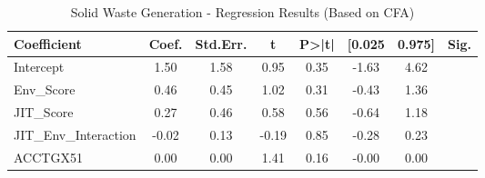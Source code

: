 \begin{table}[htbp]
    \centering
    \caption{Solid Waste Generation - Regression Results (Based on CFA)}
    \label{tab:regression}
    \begin{tabular}{lccccccc}
\toprule
Coefficient & Coef. & Std.Err. & t & P>|t| & [0.025 & 0.975] & Sig. \\
\midrule
Intercept & 1.50 & 1.58 & 0.95 & 0.35 & -1.63 & 4.62 &  \\
Env\_Score & 0.46 & 0.45 & 1.02 & 0.31 & -0.43 & 1.36 &  \\
JIT\_Score & 0.27 & 0.46 & 0.58 & 0.56 & -0.64 & 1.18 &  \\
JIT\_Env\_Interaction & -0.02 & 0.13 & -0.19 & 0.85 & -0.28 & 0.23 &  \\
ACCTGX51 & 0.00 & 0.00 & 1.41 & 0.16 & -0.00 & 0.00 &  \\
\bottomrule
\end{tabular}

    \end{table}
    